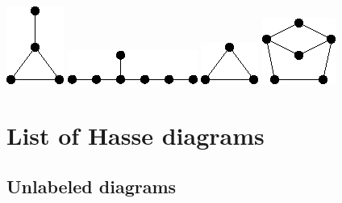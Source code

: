 \documentclass[11pt,paper=b5,footinclude,headinclude]{scrbook} %
\theoremstyle{remark}
\theoremstyle{definition} %
\theoremstyle{theorem} %
\begin{document}
\includegraphics[scale=0.5,frame]{smallGraphs/g_paw.png}     
\includegraphics[scale=0.5,frame]{smallGraphs/g_skewstar.png}     
\includegraphics[scale=0.5,frame]{smallGraphs/g_triangle.png}     
\includegraphics[scale=0.5,frame]{smallGraphs/g_twinC5.png}     


\chapter{List of Hasse diagrams\label{sec:hasse}}
\section{Unlabeled diagrams\hfill}
\end{document}
